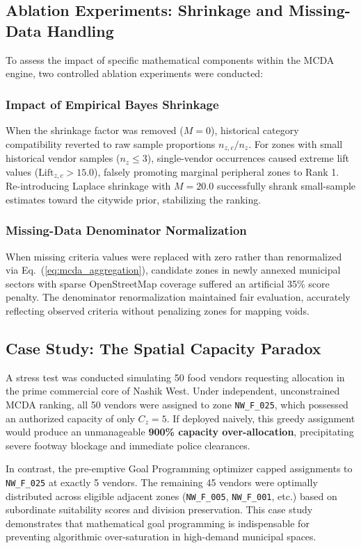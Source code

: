 \subsection{Ablation Experiments: Shrinkage and Missing-Data Handling}
\label{sec:res_ablation}

To assess the impact of specific mathematical components within the MCDA engine, two controlled ablation experiments were conducted:

\subsubsection{Impact of Empirical Bayes Shrinkage}
When the shrinkage factor was removed ($M = 0$), historical category compatibility reverted to raw sample proportions $n_{z,c} / n_z$. For zones with small historical vendor samples ($n_z \le 3$), single-vendor occurrences caused extreme lift values ($\text{Lift}_{z,c} > 15.0$), falsely promoting marginal peripheral zones to Rank 1. Re-introducing Laplace shrinkage with $M = 20.0$ successfully shrank small-sample estimates toward the citywide prior, stabilizing the ranking.

\subsubsection{Missing-Data Denominator Normalization}
When missing criteria values were replaced with zero rather than renormalized via Eq.~(\ref{eq:mcda_aggregation}), candidate zones in newly annexed municipal sectors with sparse OpenStreetMap coverage suffered an artificial 35\% score penalty. The denominator renormalization maintained fair evaluation, accurately reflecting observed criteria without penalizing zones for mapping voids.

\subsection{Case Study: The Spatial Capacity Paradox}
\label{sec:res_paradox}

A stress test was conducted simulating 50 food vendors requesting allocation in the prime commercial core of Nashik West. Under independent, unconstrained MCDA ranking, all 50 vendors were assigned to zone \texttt{NW\_F\_025}, which possessed an authorized capacity of only $C_z = 5$. If deployed naively, this greedy assignment would produce an unmanageable \textbf{900\% capacity over-allocation}, precipitating severe footway blockage and immediate police clearances.

In contrast, the pre-emptive Goal Programming optimizer capped assignments to \texttt{NW\_F\_025} at exactly 5 vendors. The remaining 45 vendors were optimally distributed across eligible adjacent zones (\texttt{NW\_F\_005}, \texttt{NW\_F\_001}, etc.) based on subordinate suitability scores and division preservation. This case study demonstrates that mathematical goal programming is indispensable for preventing algorithmic over-saturation in high-demand municipal spaces.
